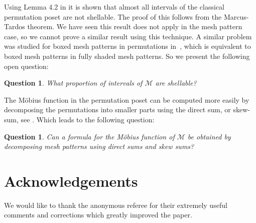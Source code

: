 \documentclass[preprint,11pt]{elsarticle}
\newtheorem{que}[thm]{Question}\crefname{que}{Question}{Questions}
\numberwithin{equation}{section}
\numberwithin{figure}{section}
\numberwithin{thm}{section}
\begin{document}
Using Lemma 4.2 in \cite{McSt13} it is shown that
almost all intervals of the classical permutation poset are not shellable. The
proof of this follows from the Marcus-Tardos theorem. We have seen this result
does not apply in the mesh pattern case, so we cannot prove a similar result
using this technique.  A similar problem was studied for boxed mesh patterns in
permutations in~\cite{AKV13}, which is equivalent to boxed mesh patterns in
fully shaded mesh patterns. So we present the following open question:

\begin{que}
What proportion of intervals of $\mathcal{M}$ are shellable?
\end{que}

The M\"obius function in the permutation poset can be computed more easily by decomposing the
permutations into smaller parts using the direct sum, or skew-sum, see \cite{BJJS11,McSt13}. Which
leads to the following question:
\begin{que}
Can a formula for the M\"obius function of $\mathcal{M}$ be obtained by decomposing mesh patterns
using direct sums and skew sums?
\end{que}

\section*{Acknowledgements} 
We would like to thank the anonymous referee for their extremely useful comments and corrections which greatly improved the paper.
\end{document}
